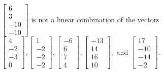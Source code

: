 \begin{exercise}
\begin{exerciseStatement}
  \end{exerciseStatement}
  \begin{exerciseAnswer}
   \(\left[\begin{array}{c}
6 \\
3 \\
-10 \\
-10
\end{array}\right]\) 
  	 is not  
	a linear combination of the vectors \(\left[\begin{array}{c}
4 \\
-2 \\
-3 \\
0
\end{array}\right] , \left[\begin{array}{c}
1 \\
-2 \\
-2 \\
-2
\end{array}\right] , \left[\begin{array}{c}
-6 \\
6 \\
7 \\
4
\end{array}\right] , \left[\begin{array}{c}
-13 \\
14 \\
16 \\
10
\end{array}\right] , \text{ and } \left[\begin{array}{c}
17 \\
-10 \\
-14 \\
-2
\end{array}\right]\).

	
  


  \end{exerciseAnswer}
\end{exercise}